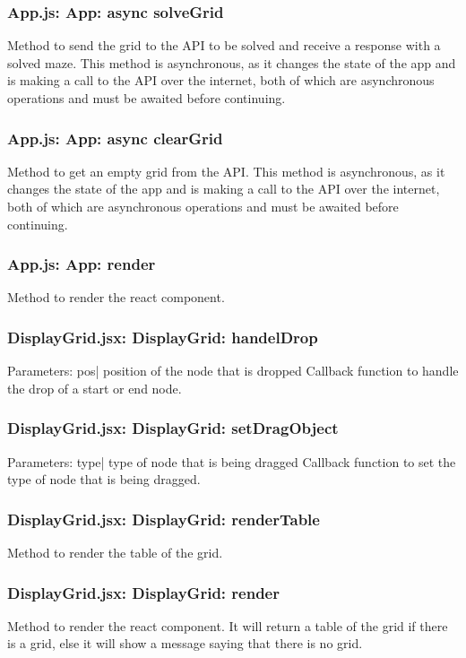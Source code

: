 \documentclass[titlepage]{article}
\begin{document}
\subsubsection{App.js: App: async solveGrid}
Method to send the grid to the API to be solved and receive a response with a solved maze. This method is asynchronous, as it changes the state of the app and is making a call to the API over the internet, both of which are asynchronous operations and must be awaited before continuing.

\subsubsection{App.js: App: async clearGrid}
Method to get an empty grid from the API. This method is asynchronous, as it changes the state of the app and is making a call to the API over the internet, both of which are asynchronous operations and must be awaited before continuing.

\subsubsection{App.js: App: render}
Method to render the react component.

\subsubsection{DisplayGrid.jsx: DisplayGrid: handelDrop}
Parameters:\newline
\indent pos| position of the node that is dropped\newline
Callback function to handle the drop of a start or end node.

\subsubsection{DisplayGrid.jsx: DisplayGrid: setDragObject}
Parameters:\newline
\indent type| type of node that is being dragged\newline
Callback function to set the type of node that is being dragged.

\subsubsection{DisplayGrid.jsx: DisplayGrid: renderTable}
Method to render the table of the grid.

\subsubsection{DisplayGrid.jsx: DisplayGrid: render}
Method to render the react component. It will return a table of the grid if there is a grid, else it will show a message saying that there is no grid.
\end{document}
